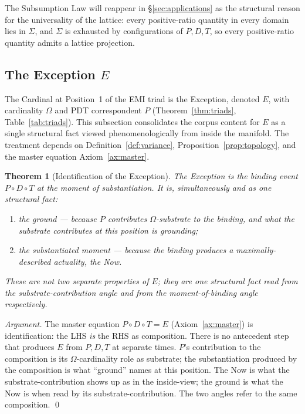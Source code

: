 \documentclass[11pt,a4paper]{article}
\newtheorem{theorem}{Theorem}[section]
\theoremstyle{definition}
\theoremstyle{remark}
\begin{document}
The Subsumption Law will reappear in \S\ref{sec:applications} as the structural reason for the universality of the lattice: every positive-ratio quantity in every domain lies in $\Sigma$, and $\Sigma$ is exhausted by configurations of $P,D,T$, so every positive-ratio quantity admits a lattice projection.

\subsection{The Exception $E$}\label{subsec:exception}

The Cardinal at Position~1 of the EMI triad is the Exception, denoted $E$, with cardinality $\Omega$ and PDT correspondent $P$ (Theorem~\ref{thm:triads}, Table~\ref{tab:triads}). This subsection consolidates the corpus content for $E$ as a single structural fact viewed phenomenologically from inside the manifold. The treatment depends on Definition~\ref{def:variance}, Proposition~\ref{prop:topology}, and the master equation Axiom~\ref{ax:master}.

\begin{theorem}[Identification of the Exception]\label{thm:exception-identification}
The Exception is the binding event $P\circ D\circ T$ at the moment of substantiation. It is, simultaneously and as one structural fact:
\begin{enumerate}[label=(\roman*),leftmargin=*]
\item the \emph{ground} --- because $P$ contributes $\Omega$-substrate to the binding, and what the substrate contributes at this position is grounding;
\item the \emph{substantiated moment} --- because the binding produces a maximally-described actuality, the Now.
\end{enumerate}
These are not two separate properties of $E$; they are one structural fact read from the substrate-contribution angle and from the moment-of-binding angle respectively.
\end{theorem}

\begin{proof}[Argument]
The master equation $P \circ D \circ T = E$ (Axiom~\ref{ax:master}) is identification: the LHS \emph{is} the RHS as composition. There is no antecedent step that produces $E$ from $P,D,T$ at separate times. $P$'s contribution to the composition is its $\Omega$-cardinality role as substrate; the substantiation produced by the composition is what ``ground'' names at this position. The Now is what the substrate-contribution shows up as in the inside-view; the ground is what the Now is when read by its substrate-contribution. The two angles refer to the same composition. \qed
\end{proof}
\end{document}

